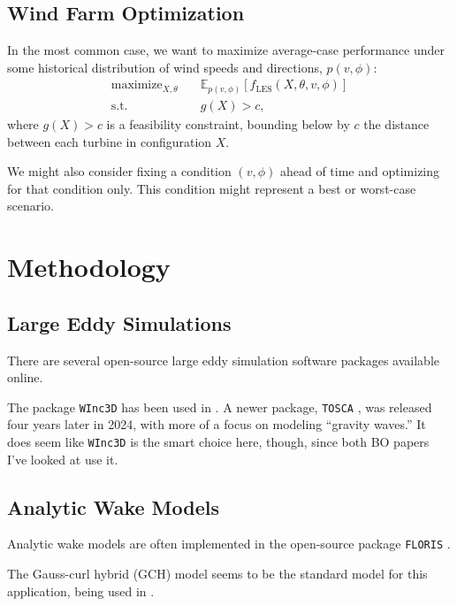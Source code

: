 \documentclass[12pt]{article}
\begin{document}
\subsection{Wind Farm Optimization}
In the most common case, we want to maximize average-case performance under some historical
distribution of wind speeds and directions, $p(v, \phi)$:
\begin{align*}
    \text{maximize}_{X, \theta}& \quad \mathbb{E}_{p(v, \phi)}[f_\text{LES}(X, \theta, v, \phi)] \\
    \text{s.t.}& \quad g(X) > c
,\end{align*}
where $g(X) > c$ is a feasibility constraint, bounding below by $c$ the
distance between each turbine in configuration $X$.

We might also consider fixing a condition $(v, \phi)$ ahead of time and
optimizing for that condition only. This condition might represent a best or
worst-case scenario.


\section{Methodology}

\subsection{Large Eddy Simulations}
There are several open-source large eddy simulation software packages available online.

The package \texttt{WInc3D} \cite{deskosWInc3DNovelFramework2020} has been used
in \cite{bempedelisDatadrivenOptimisationWind2024,
moleMultiFidelityBayesianOptimisation2024}. A newer package, \texttt{TOSCA}
\cite{stipaTOSCAOpensourceFinitevolume2024}, was released four years later in
2024, with more of a focus on modeling ``gravity waves.'' It does seem like \texttt{WInc3D}
is the smart choice here, though, since both BO papers I've looked at use it.

\subsection{Analytic Wake Models}

Analytic wake models are often implemented in the open-source package
\texttt{FLORIS} \cite{mudafortNRELFlorisV4212024}.

The Gauss-curl hybrid (GCH) model \cite{niayifarAnalyticalModelingWind2016}
seems to be the standard model for this application, being used in
\cite{moleMultiFidelityBayesianOptimisation2024,
bempedelisDatadrivenOptimisationWind2024}.
\end{document}
